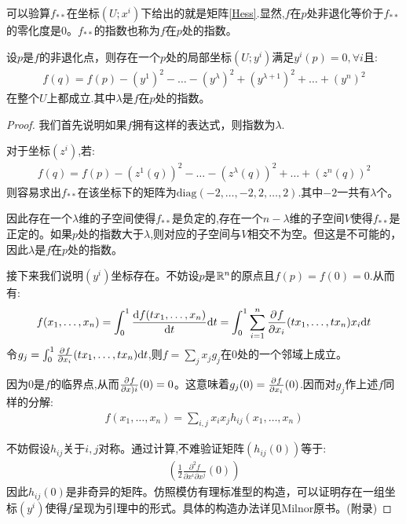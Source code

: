 可以验算$f_{**}$在坐标$(U;x^i)$下给出的就是矩阵\ref{Hess}.显然,$f$在$p$处非退化等价于$f_{**}$的零化度是$0$。$f_{**}$的指数也称为$f$在$p$处的指数。

\begin{lemma}[Morse引理]\label{Morse-lemma}
	设$p$是$f$的非退化点，则存在一个$p$处的局部坐标$(U;y^i)$满足$y^i(p)=0,\forall i$且:
	\begin{align}
		f(q)=f(p)-(y^1)^2-\dots-(y^\lambda)^2+(y^{\lambda+1})^2+\dots+(y^n)^2
	\end{align}
	在整个$U$上都成立.其中$\lambda$是$f$在$p$处的指数。
\end{lemma}
\begin{proof}
	我们首先说明如果$f$拥有这样的表达式，则指数为$\lambda$.

	对于坐标$(z^i)$,若:
	\begin{align*}
		f(q)=f(p)-(z^1(q))^2-\dots-(z^\lambda(q))^2+\dots+(z^n(q))^2
	\end{align*}
	则容易求出$f_{**}$在该坐标下的矩阵为$\mathrm{diag}(-2,\dots,-2,2,\dots,2)$.其中$-2$一共有$\lambda$个。

	因此存在一个$\lambda$维的子空间使得$f_{**}$是负定的,存在一个$n-\lambda$维的子空间$V$使得$f_{**}$是正定的。如果$p$处的指数大于$\lambda$,则对应的子空间与$V$相交不为空。但这是不可能的，因此$\lambda$是$f$在$p$处的指数。

	接下来我们说明$(y^i)$坐标存在。不妨设$p$是$\mathbb{R}^n$的原点且$f(p)=f(0)=0$.从而有:
	\begin{align}
		f(x_1,\dots,x_n)=\int_0^1\frac{\mathrm{d} f(tx_1,\dots,x_n)}{\mathrm{d}   t}\mathrm{d} t=\int_0^1 \sum_{i=1}^n \frac{\partial^{} f}{\partial {x_i}^{}}(tx_1,\dots,tx_n)x_i\mathrm{d} t
	\end{align}
	令$g_j=\int_0^1\frac{\partial^{} f}{\partial {x_i}^{}}(tx_1,\dots,tx_n)\mathrm{d} t$,则$f=\sum_j  x_jg_j$在$0$处的一个邻域上成立。

	因为$0$是$f$的临界点,从而$\frac{\partial^{} f}{\partial {x)i}^{}}(0)=0$。这意味着$g_j(0)=\frac{\partial^{} f}{\partial {x_i}^{}}(0)$.因而对$g_j$作上述$f$同样的分解:
	\begin{align*}
		f(x_1,\dots,x_n)=\sum_{i,j} x_ix_jh_{ij}(x_1,\dots,x_n)
	\end{align*}
	
	不妨假设$h_{ij}$关于$i,j$对称。通过计算,不难验证矩阵$(h_{ij}(0))$等于:
	\begin{align*}
		(\frac{1}{2}\frac{\partial^2f}{\partial x^i\partial x^j}(0))
	\end{align*}
	因此$h_{ij}(0)$是非奇异的矩阵。仿照模仿有理标准型的构造，可以证明存在一组坐标$(y^i)$使得$f$呈现为引理中的形式。具体的构造办法详见Milnor原书。(附录)
\end{proof}


